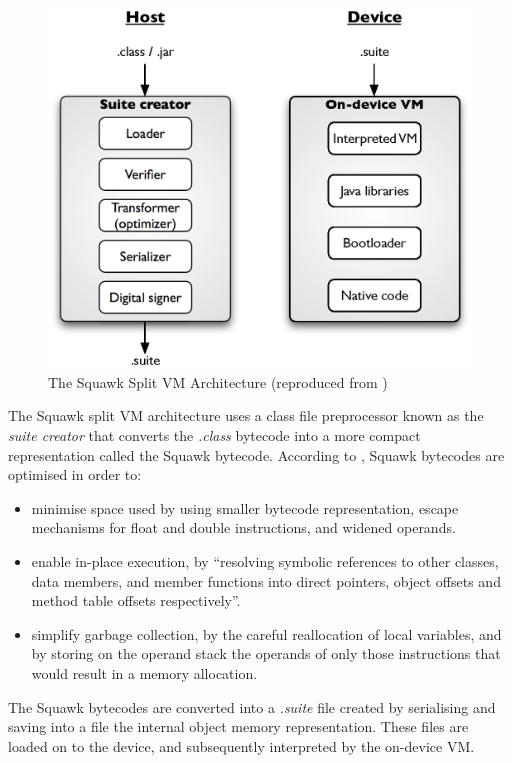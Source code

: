 \begin{figure}[h]
\centering
\includegraphics[scale=0.61]{img/Squawk_architecture.eps} 
\caption[The Squawk Split VM Architecture]{The Squawk
Split VM Architecture (reproduced from \cite{simon_squawk:2006})}
\label{Fig:SquawkVM_architecture}
\end{figure}  

The Squawk split VM architecture uses a class file preprocessor known as the
\emph{suite creator} that converts the \emph{.class} bytecode into a more
compact representation called the Squawk bytecode. According to
\cite{simon_squawk:2006}, Squawk bytecodes are optimised in order to:
\begin{itemize}
\item minimise space used by using smaller bytecode representation, escape
mechanisms for float and double instructions, and widened operands. 
\item enable in-place execution, by ``resolving symbolic references to other
classes, data members, and member functions into direct pointers, object offsets
and method table offsets respectively''.
\item simplify garbage collection, by the careful reallocation of local
variables, and by storing on the operand stack the operands of only those instructions that would result in a memory allocation.
\end{itemize}

The Squawk bytecodes are converted into a \emph{.suite} file created by
serialising and saving into a file the internal object memory representation.
These files are loaded on to the device, and subsequently interpreted by the
on-device VM.

